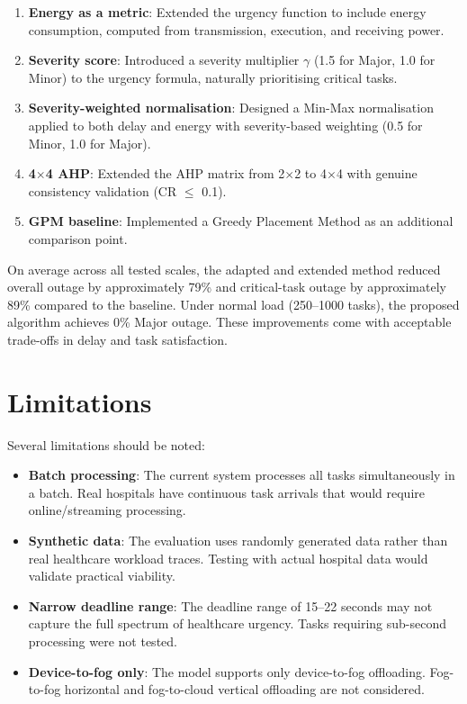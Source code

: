 \begin{enumerate}
\item \textbf{Energy as a metric}: Extended the urgency function to include energy consumption, computed from transmission, execution, and receiving power.

\item \textbf{Severity score}: Introduced a severity multiplier $\gamma$ (1.5 for Major, 1.0 for Minor) to the urgency formula, naturally prioritising critical tasks.

\item \textbf{Severity-weighted normalisation}: Designed a Min-Max normalisation applied to both delay and energy with severity-based weighting (0.5 for Minor, 1.0 for Major).

\item \textbf{4$\times$4 AHP}: Extended the AHP matrix from 2$\times$2 to 4$\times$4 with genuine consistency validation (CR $\leq$ 0.1).

\item \textbf{GPM baseline}: Implemented a Greedy Placement Method as an additional comparison point.
\end{enumerate}

On average across all tested scales, the adapted and extended method reduced overall outage by approximately 79\% and critical-task outage by approximately 89\% compared to the baseline. Under normal load (250--1000 tasks), the proposed algorithm achieves 0\% Major outage. These improvements come with acceptable trade-offs in delay and task satisfaction.

\section{Limitations}

Several limitations should be noted:
\begin{itemize}
\item \textbf{Batch processing}: The current system processes all tasks simultaneously in a batch. Real hospitals have continuous task arrivals that would require online/streaming processing.
\item \textbf{Synthetic data}: The evaluation uses randomly generated data rather than real healthcare workload traces. Testing with actual hospital data would validate practical viability.
\item \textbf{Narrow deadline range}: The deadline range of 15--22 seconds may not capture the full spectrum of healthcare urgency. Tasks requiring sub-second processing were not tested.
\item \textbf{Device-to-fog only}: The model supports only device-to-fog offloading. Fog-to-fog horizontal and fog-to-cloud vertical offloading are not considered.
\end{itemize}

